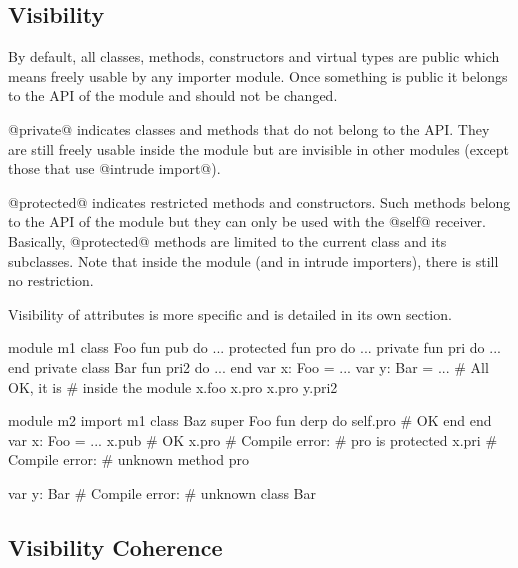 \subsection{Visibility}\label{visibility}

By default, all classes, methods, constructors and virtual types are public which means freely usable by any importer module.
Once something is public it belongs to the API of the module and should not be changed.

@private@ indicates classes and methods that do not belong to the API.
They are still freely usable inside the module but are invisible in other modules (except those that use @intrude import@).

@protected@ indicates restricted methods and constructors.
Such methods belong to the API of the module but they can only be used with the @self@ receiver.
Basically, @protected@ methods are limited to the current class and its subclasses.
Note that inside the module (and in intrude importers), there is still no restriction.

Visibility of attributes is more specific and is detailed in its own section.

\begin{multicols}{2}
\begin{lst}
module m1
class Foo
	fun pub do ...
	protected fun pro
	do ...
	private fun pri
	do ...
end
private class Bar
	fun pri2 do ...
end
var x: Foo = ...
var y: Bar = ...
# All OK, it is
# inside the module
x.foo
x.pro
x.pro
y.pri2
\end{lst}
\columnbreak
\begin{lst}
module m2
import m1
class Baz
	super Foo
	fun derp
	do
		self.pro # OK
	end
end
var x: Foo = ...
x.pub # OK
x.pro # Compile error:
      # pro is protected
x.pri # Compile error:
      # unknown method pro

var y: Bar
# Compile error:
# unknown class Bar
\end{lst}
\end{multicols}

\subsection{Visibility Coherence}

